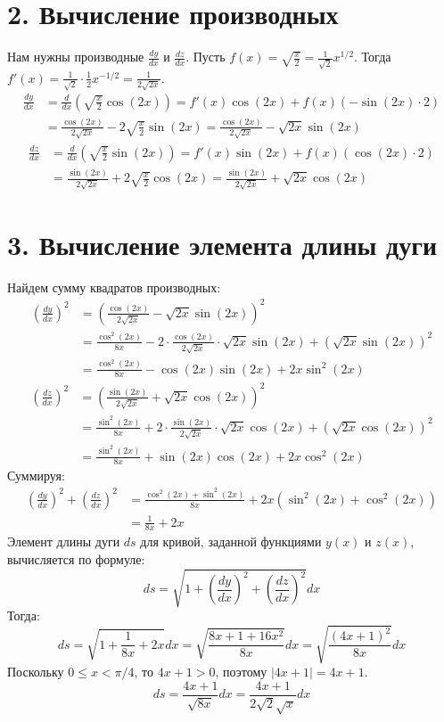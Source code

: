 \documentclass{article}
\begin{document}
\section*{2. Вычисление производных}
Нам нужны производные $\frac{dy}{dx}$ и $\frac{dz}{dx}$.
Пусть $f(x) = \sqrt{\frac{x}{2}} = \frac{1}{\sqrt{2}} x^{1/2}$. Тогда $f'(x) = \frac{1}{\sqrt{2}} \cdot \frac{1}{2} x^{-1/2} = \frac{1}{2\sqrt{2x}}$.
\begin{align*}
    \frac{dy}{dx} &= \frac{d}{dx} \left( \sqrt{\frac{x}{2}} \cos(2x) \right) = f'(x)\cos(2x) + f(x)(-\sin(2x) \cdot 2) \\
    &= \frac{\cos(2x)}{2\sqrt{2x}} - 2\sqrt{\frac{x}{2}}\sin(2x) = \frac{\cos(2x)}{2\sqrt{2x}} - \sqrt{2x}\sin(2x)
\end{align*}
\begin{align*}
    \frac{dz}{dx} &= \frac{d}{dx} \left( \sqrt{\frac{x}{2}} \sin(2x) \right) = f'(x)\sin(2x) + f(x)(\cos(2x) \cdot 2) \\
    &= \frac{\sin(2x)}{2\sqrt{2x}} + 2\sqrt{\frac{x}{2}}\cos(2x) = \frac{\sin(2x)}{2\sqrt{2x}} + \sqrt{2x}\cos(2x)
\end{align*}

\section*{3. Вычисление элемента длины дуги}
Найдем сумму квадратов производных:
\begin{align*}
    \left(\frac{dy}{dx}\right)^2 &= \left(\frac{\cos(2x)}{2\sqrt{2x}} - \sqrt{2x}\sin(2x)\right)^2 \\
    &= \frac{\cos^2(2x)}{8x} - 2 \cdot \frac{\cos(2x)}{2\sqrt{2x}} \cdot \sqrt{2x}\sin(2x) + ( \sqrt{2x}\sin(2x) )^2 \\
    &= \frac{\cos^2(2x)}{8x} - \cos(2x)\sin(2x) + 2x\sin^2(2x)
\end{align*}
\begin{align*}
    \left(\frac{dz}{dx}\right)^2 &= \left(\frac{\sin(2x)}{2\sqrt{2x}} + \sqrt{2x}\cos(2x)\right)^2 \\
    &= \frac{\sin^2(2x)}{8x} + 2 \cdot \frac{\sin(2x)}{2\sqrt{2x}} \cdot \sqrt{2x}\cos(2x) + ( \sqrt{2x}\cos(2x) )^2 \\
    &= \frac{\sin^2(2x)}{8x} + \sin(2x)\cos(2x) + 2x\cos^2(2x)
\end{align*}
Суммируя:
\begin{align*}
    \left(\frac{dy}{dx}\right)^2 + \left(\frac{dz}{dx}\right)^2 &= \frac{\cos^2(2x) + \sin^2(2x)}{8x} + 2x(\sin^2(2x) + \cos^2(2x)) \\
    &= \frac{1}{8x} + 2x
\end{align*}
Элемент длины дуги $ds$ для кривой, заданной функциями $y(x)$ и $z(x)$, вычисляется по формуле:
\[ ds = \sqrt{1 + \left(\frac{dy}{dx}\right)^2 + \left(\frac{dz}{dx}\right)^2} dx \]
Тогда:
\[ ds = \sqrt{1 + \frac{1}{8x} + 2x} dx = \sqrt{\frac{8x + 1 + 16x^2}{8x}} dx = \sqrt{\frac{(4x+1)^2}{8x}} dx \]
Поскольку $0 \le x < \pi/4$, то $4x+1 > 0$, поэтому $|4x+1| = 4x+1$.
\[ ds = \frac{4x+1}{\sqrt{8x}} dx = \frac{4x+1}{2\sqrt{2}\sqrt{x}} dx \]
\end{document}
